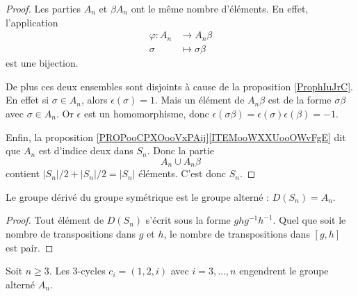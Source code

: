\begin{proof}
	Les parties \( A_n\) et \( \beta A_n\) ont le même nombre d'éléments. En effet, l'application
	\begin{equation}
		\begin{aligned}
			\varphi\colon A_n & \to A_n\beta        \\
			\sigma            & \mapsto \sigma\beta
		\end{aligned}
	\end{equation}
	est une bijection.

	De plus ces deux ensembles sont disjoints à cause de la proposition \ref{ProphIuJrC}. En effet si \( \sigma\in A_n\), alors \( \epsilon(\sigma)=1\). Mais un élément de \( A_n\beta\) est de la forme \( \sigma\beta\) avec \( \sigma\in A_n\). Or \( \epsilon\) est un homomorphisme, donc \( \epsilon(\sigma\beta)=\epsilon(\sigma)\epsilon(\beta)=-1\).

	Enfin, la proposition \ref{PROPooCPXOooVxPAij}\ref{ITEMooWXXUooOWvFgE} dit que \( A_n\) est d'indice deux dans \( S_n\). Donc la partie
	\begin{equation}
		A_n\cup A_n\beta
	\end{equation}
	contient \( | S_n |/2+| S_n |/2=| S_n |\) éléments. C'est donc \( S_n\).
\end{proof}

\begin{lemma}   \label{LemiApyfp}   
	Le groupe dérivé du groupe symétrique est le groupe alterné : \( D(S_n)=A_n\).
\end{lemma}

\begin{proof}
	Tout élément de \( D(S_n)\) s'écrit sous la forme \( ghg^{-1}h^{-1}\). Quel que soit le nombre de transpositions dans \( g\) et \( h\), le nombre de transpositions dans \( [g,h]\) est pair.
\end{proof}

\begin{proposition}     \label{PropsHlmvv}
	Soit \( n\geq 3\). Les \( 3\)-cycles \( c_i=(1,2,i)\) avec \( i=3,\ldots, n\) engendrent le groupe alterné \( A_n\).
\end{proposition}

